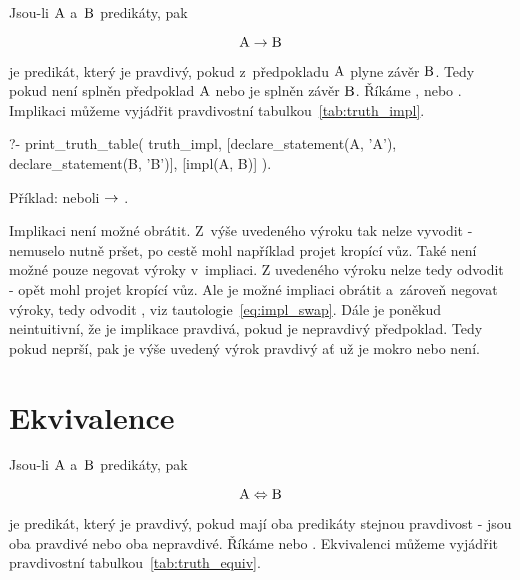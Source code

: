 Jsou-li \(\mathrm{A}\) a~\(\mathrm{B}\) predikáty, pak

\begin{equation}
\mathrm{A} \rightarrow \mathrm{B}
\end{equation}

je predikát, který je pravdivý, pokud z~předpokladu \(\mathrm{A}\) plyne závěr \(\mathrm{B}\). Tedy pokud není splněn předpoklad \(\mathrm{A}\) nebo je splněn závěr \(\mathrm{B}\). Říkáme ,  nebo .
Implikaci můžeme vyjádřit pravdivostní tabulkou~\ref{tab:truth_impl}.

\begin{prolog}
?- print_truth_table(
	truth_impl,
	[declare_statement(A, 'A'), declare_statement(B, 'B')],
	[impl(A, B)]
).
\end{prolog}

Příklad:  neboli  \(\rightarrow\) .

Implikaci není možné obrátit. Z~výše uvedeného výroku tak nelze vyvodit  - nemuselo nutně pršet, po cestě mohl například projet kropící vůz. Také není možné pouze negovat výroky v~impliaci. Z uvedeného výroku nelze tedy odvodit  - opět mohl projet kropící vůz. Ale je možné impliaci obrátit a~zároveň negovat výroky, tedy odvodit , viz tautologie~\eqref{eq:impl_swap}. Dále je poněkud neintuitivní, že je implikace pravdivá, pokud je nepravdivý předpoklad. Tedy pokud neprší, pak je výše uvedený výrok pravdivý ať už je mokro nebo není. 

\section{Ekvivalence}

Jsou-li \(\mathrm{A}\) a~\(\mathrm{B}\) predikáty, pak

\begin{equation}
\mathrm{A} \Leftrightarrow \mathrm{B} 
\end{equation}

je predikát, který je pravdivý, pokud mají oba predikáty stejnou pravdivost - jsou oba pravdivé nebo oba nepravdivé. Říkáme  nebo .
Ekvivalenci můžeme vyjádřit pravdivostní tabulkou~\ref{tab:truth_equiv}.

